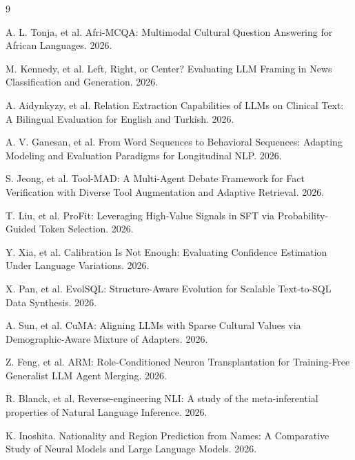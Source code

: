 \documentclass{article}
\begin{document}
\begin{thebibliography}{9}

A. L. Tonja, et al. Afri-MCQA: Multimodal Cultural Question Answering for African Languages. 2026.

M. Kennedy, et al. Left, Right, or Center? Evaluating LLM Framing in News Classification and Generation. 2026.

A. Aidynkyzy, et al. Relation Extraction Capabilities of LLMs on Clinical Text: A Bilingual Evaluation for English and Turkish. 2026.

A. V. Ganesan, et al. From Word Sequences to Behavioral Sequences: Adapting Modeling and Evaluation Paradigms for Longitudinal NLP. 2026.

S. Jeong, et al. Tool-MAD: A Multi-Agent Debate Framework for Fact Verification with Diverse Tool Augmentation and Adaptive Retrieval. 2026.

T. Liu, et al. ProFit: Leveraging High-Value Signals in SFT via Probability-Guided Token Selection. 2026.

Y. Xia, et al. Calibration Is Not Enough: Evaluating Confidence Estimation Under Language Variations. 2026.

X. Pan, et al. EvolSQL: Structure-Aware Evolution for Scalable Text-to-SQL Data Synthesis. 2026.

A. Sun, et al. CuMA: Aligning LLMs with Sparse Cultural Values via Demographic-Aware Mixture of Adapters. 2026.

Z. Feng, et al. ARM: Role-Conditioned Neuron Transplantation for Training-Free Generalist LLM Agent Merging. 2026.

R. Blanck, et al. Reverse-engineering NLI: A study of the meta-inferential properties of Natural Language Inference. 2026.

K. Inoshita. Nationality and Region Prediction from Names: A Comparative Study of Neural Models and Large Language Models. 2026.


\end{thebibliography}
\end{document}
